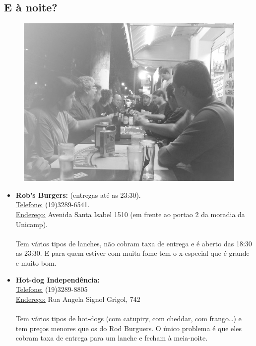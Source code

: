 \subsection{E à noite?}
\begin{figure}[b!]
    \centering
    \includegraphics[scale=0.72,keepaspectratio=true]{img/imgs/6-comida/-052.jpg}
\end{figure}

\begin{itemize}
\item  \textbf{Rob's Burgers:} (entregas até as 23:30).
\\\underline{Telefone:} (19)3289-6541.
\\\underline{Endereço:} Avenida Santa Isabel 1510 (em frente ao portao 2 da moradia da Unicamp).
\\\\Tem vários tipos de lanches, não cobram taxa de entrega e é aberto das 18:30 as 23:30. E para quem estiver com muita fome tem o x-especial que é grande e muito bom.
\end{itemize}

\begin{itemize}
\item  \textbf{Hot-dog Independência:}
\\\underline{Telefone:} (19)3289-8805
\\\underline{Endereço:} Rua Angela Signol Grigol, 742
\\\\Tem vários tipos de hot-dogs (com catupiry, com cheddar, com frango{\dots}) e tem preços menores que os do Rod Burguers. O único problema é que eles cobram taxa de entrega para um lanche e fecham à meia-noite.
\end{itemize}

